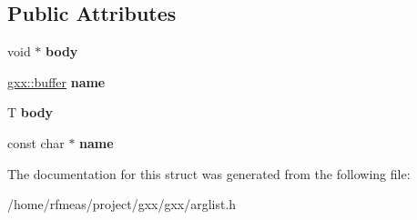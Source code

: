 \subsection*{Public Attributes}
\begin{DoxyCompactItemize}
\item 
void $\ast$ {\bfseries body}\hypertarget{classgxx_1_1argpair_a7befa9a27d134c4c28ff8680b5337ef4}{}\label{classgxx_1_1argpair_a7befa9a27d134c4c28ff8680b5337ef4}

\item 
\hyperlink{classgxx_1_1buffer}{gxx\+::buffer} {\bfseries name}\hypertarget{classgxx_1_1argpair_a7d0492ac56c6b7e5d12af75a7508a48b}{}\label{classgxx_1_1argpair_a7d0492ac56c6b7e5d12af75a7508a48b}

\item 
T {\bfseries body}\hypertarget{classgxx_1_1argpair_ac1ac06472748b89a1af967b012e05aed}{}\label{classgxx_1_1argpair_ac1ac06472748b89a1af967b012e05aed}

\item 
const char $\ast$ {\bfseries name}\hypertarget{classgxx_1_1argpair_a2da2dc8aca332617ce4ae0638b177d9c}{}\label{classgxx_1_1argpair_a2da2dc8aca332617ce4ae0638b177d9c}

\end{DoxyCompactItemize}


The documentation for this struct was generated from the following file\+:\begin{DoxyCompactItemize}
\item 
/home/rfmeas/project/gxx/gxx/arglist.\+h\end{DoxyCompactItemize}
